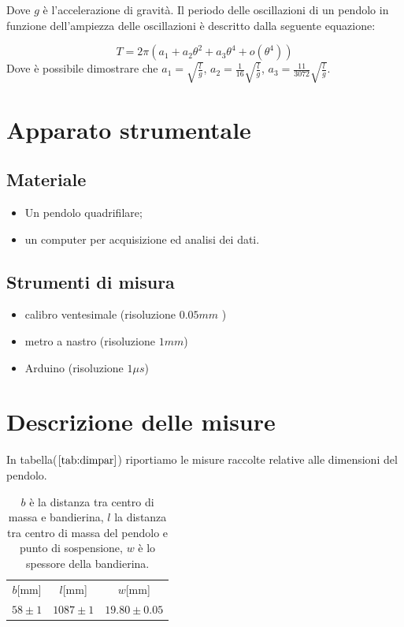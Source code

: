 \documentclass{article}
\begin{document}
Dove  $g $ è l'accelerazione di gravità.
Il periodo delle oscillazioni di un pendolo in funzione dell'ampiezza delle oscillazioni è descritto dalla seguente equazione:

\begin{equation}
T = 2\pi (a_1+a_2\theta^2+a_3\theta^4+ o( \theta^4 ))
\label{eq:tht}
\end{equation}
Dove è possibile dimostrare che $a_1=\sqrt{\frac{l}{g}}$, $a_2=\frac{1}{16}\sqrt{\frac{l}{g}}$, $a_3=\frac{11}{3072}\sqrt{\frac{l}{g}}$.






\section{Apparato strumentale}

\subsection{Materiale}

\begin{itemize}
\item  Un pendolo quadrifilare;
\item  un computer per acquisizione ed analisi dei dati.
\end{itemize}

\subsection{Strumenti di misura}

\begin{itemize}
\item  calibro  ventesimale (risoluzione $ 0.05 mm$ )
\item  metro a nastro (risoluzione $1 mm$)
\item Arduino (risoluzione $1\mu s$)
\end{itemize}





\section{Descrizione delle misure}


In tabella($\ref{tab:dimpar}$) riportiamo le misure raccolte relative alle dimensioni del pendolo.
\begin{table}[h!]
		\centering
		\begin{tabular}{|ccc|}
			\hline
			$b $[mm] & $l$[mm] & $w$[mm]	\\
			$58 \pm 1$	 & 	$	1087\pm1$ 	& $19.80\pm0.05$\\
			\hline
			
		\end{tabular}
		
		\label{tab:dimpar}	
		\caption{$b$ è la distanza tra centro di massa e bandierina, $l$ la distanza tra centro di massa del pendolo e  punto di sospensione, $w$ è lo spessore della bandierina.} 


\end{table}
\end{document}

